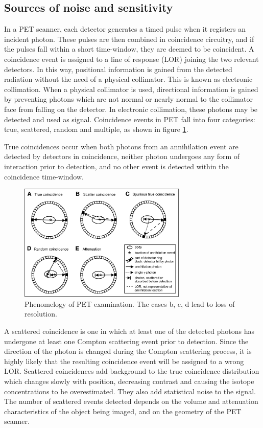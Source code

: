 \subsection{Sources of noise and sensitivity}
In a PET scanner, each detector generates a timed pulse when it registers an incident photon. These pulses are then combined in coincidence circuitry, and if the pulses fall within a short time-window, they are deemed to be coincident.
A coincidence event is assigned to a line of response (LOR) joining the two relevant detectors. In this way, positional information is gained from the detected radiation without the need of a physical collimator. This is known as electronic collimation.
When a physical collimator is used, directional information is gained by preventing photons which are not normal or nearly normal to the collimator face from falling on the detector. In electronic collimation, these photons may be detected and used as signal.
Coincidence events in PET fall into four categories: true, scattered, random and multiple, as shown in figure \ref{fig:coinc}. 

True coincidences occur when both photons from an annihilation event are detected by detectors in coincidence, neither photon undergoes any form of interaction prior to detection, and no other event is detected within the coincidence time-window.

\begin{figure}  
\centering
\includegraphics[width=8cm]{Pictures/Chapter_1/coinci_PET}
\caption[Coincidencies in PET exam]{Phenomelogy of PET examination. The cases b, c, d lead to loss of resolution.}
\label{fig:coinc}
\end{figure}

A scattered coincidence is one in which at least one of the detected photons has undergone at least one Compton scattering event prior to detection. Since the direction of the photon is changed during the Compton scattering process, it is highly likely that the resulting coincidence event will be assigned to a wrong LOR. Scattered coincidences add background to the true coincidence distribution which changes slowly with position, decreasing contrast and causing the isotope concentrations to be overestimated. They also add statistical noise to the signal. The number of scattered events detected depends on the volume and attenuation characteristics of the object being imaged, and on the geometry of the PET scanner.

